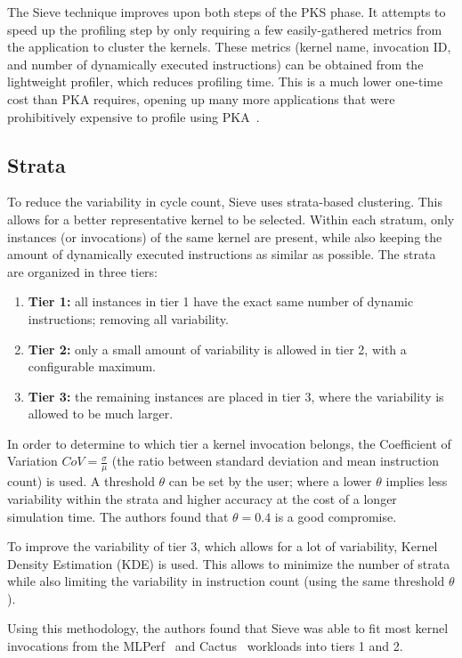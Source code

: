 The Sieve technique improves upon both steps of the PKS phase.
It attempts to speed up the profiling step by only requiring a few easily-gathered metrics from the application to cluster the kernels.
These metrics (kernel name, invocation ID, and number of dynamically executed instructions) can be obtained from the lightweight profiler, which reduces profiling time.
This is a much lower one-time cost than PKA requires, opening up many more applications that were prohibitively expensive to profile using PKA\ .

\subsection{Strata}\label{subsec:strata}
To reduce the variability in cycle count, Sieve uses strata-based clustering.
This allows for a better representative kernel to be selected.
Within each stratum, only instances (or invocations) of the same kernel are present, while also keeping the amount of dynamically executed instructions as similar as possible.
The strata are organized in three tiers:
\begin{enumerate}
    \item \textbf{Tier 1:} all instances in tier 1 have the exact same number of dynamic instructions; removing all variability.
    \item \textbf{Tier 2:} only a small amount of variability is allowed in tier 2, with a configurable maximum.
    \item \textbf{Tier 3:} the remaining instances are placed in tier 3, where the variability is allowed to be much larger.
\end{enumerate}
In order to determine to which tier a kernel invocation belongs, the Coefficient of Variation $CoV = \frac{\sigma}{\mu}$ (the ratio between standard deviation and mean instruction count) is used.
A threshold $\theta$ can be set by the user; where a lower $\theta$ implies less variability within the strata and higher accuracy at the cost of a longer simulation time.
The authors found that $\theta = 0.4$ is a good compromise.

To improve the variability of tier 3, which allows for a lot of variability, Kernel Density Estimation (KDE) is used.
This allows to minimize the number of strata while also limiting the variability in instruction count (using the same threshold $\theta$).

Using this methodology, the authors found that Sieve was able to fit most kernel invocations from the MLPerf~\cite{mlperf} and Cactus~\cite{cactus} workloads into tiers 1 and 2.

